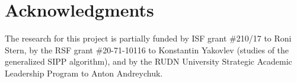 \documentclass[letterpaper]{article} %
\begin{document}
\section*{Acknowledgments}
The research for this project is partially funded by ISF grant \#210/17 to Roni Stern, by the RSF grant 
\#20-71-10116 to Konstantin Yakovlev (studies of the generalized SIPP algorithm), and by the RUDN University Strategic Academic Leadership Program to Anton Andreychuk. 


\end{document}
